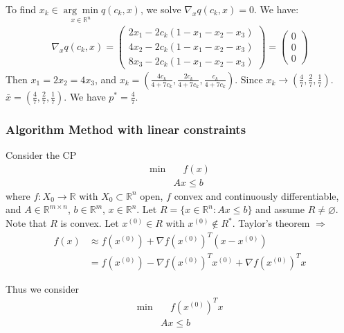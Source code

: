 To find $x_k\in \underset{x\in \mathbb{R}^n}{\arg\min} q(c_k, x)$, we solve $\nabla_x q(c_k, x) = 0$. We have:
\begin{align*}
    \nabla_x q(c_k, x) = \left(\begin{array}{c}
         2x_1 - 2c_k(1-x_1-x_2-x_3)  \\
         4x_2 - 2c_k(1-x_1-x_2-x_3)  \\
         8x_3 - 2c_k(1-x_1-x_2-x_3)
    \end{array} \right) = \left(\begin{array}{c}
         0  \\
         0  \\
         0
    \end{array} \right)
\end{align*}
Then $x_1 = 2x_2 = 4x_3$, and $x_k = \left(\frac{4c_k}{4+7c_k}, \frac{2c_k}{4+7c_k}, \frac{c_k}{4+7c_k}\right)$. Since $x_k\to(\frac{4}{7}, \frac{2}{7}, \frac{1}{7})$. $\bar{x} = (\frac{4}{7}, \frac{2}{7}, \frac{1}{7})$. We have $p^* = \frac{4}{7}$.

\subsubsection{Algorithm Method with linear constraints}
Consider the CP
\begin{align}
    \min & \quad f(x) \label{1.27} \\
    & Ax\leqslant b \nonumber 
\end{align}
where $f: X_0\to\mathbb{R}$ with $X_0\subset\mathbb{R}^n$ open, $f$ convex and continuously differentiable, and $A\in \mathbb{R}^{m\times n}$, $b\in\mathbb{R}^m$, $x\in \mathbb{R}^n$. Let $R = \{x\in\mathbb{R}^n:Ax\leqslant b\}$ and assume $R\neq\varnothing$. Note that $R$ is convex. Let $x^{(0)}\in R$ with $x^{(0)}\notin R^*$. Taylor's theorem $\Longrightarrow$
\begin{align*}
    f(x) &\approx f(x^{(0)}) + \nabla f(x^{(0)})^T (x-x^{(0)}) \\
    & = f(x^{(0)}) - \nabla f(x^{(0)})^T x^{(0)} + \nabla f(x^{(0)})^T x
\end{align*}

Thus we consider
\begin{align}
    \min & \quad f(x^{(0)})^T x \label{1.28} \\
    & Ax\leqslant b\nonumber
\end{align}

